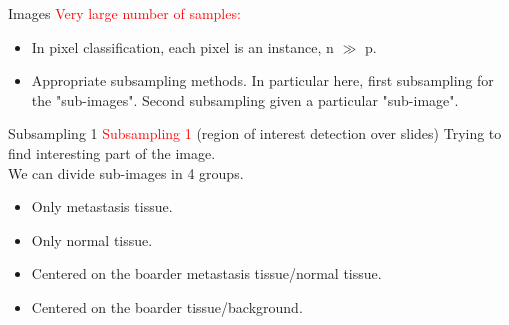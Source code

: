 \documentclass{beamer}
\begin{document}
\begin{frame}[noframenumbering]{Images}
\textcolor{red}{Very large number of samples:}
\begin{itemize}
\item In pixel classification, each pixel is an instance, n $\gg$ p.
\item Appropriate subsampling methods. In particular here, first subsampling for the "sub-images". Second subsampling given a particular "sub-image".
\end{itemize}
\end{frame}


\begin{frame}[noframenumbering]{Subsampling 1}
\textcolor{red}{Subsampling 1} (region of interest detection over slides)
Trying to find interesting part of the image. \\
We can divide sub-images in 4 groups.
\begin{itemize}
\item Only metastasis tissue.
\item Only normal tissue.
\item Centered on the boarder metastasis tissue/normal tissue.
\item Centered on the boarder tissue/background.
\end{itemize}
\end{frame}
\end{document}
